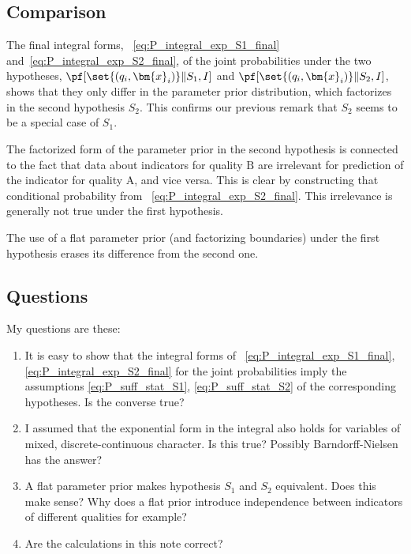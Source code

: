 \documentclass[10pt,%
onecolumn,oneside,a5paper,article,frenchb,italian,german,swedish,latin,british%
]{memoir}
\newcommand*{\yI}{I}
\newcommand*{\yS}{S}
\newcommand*{\yh}{q}
\newcommand*{\bx}{\bm{x}}
\newcommand*{\ya}{\textrm{A}}
\newcommand*{\yb}{\textrm{B}}
\begin{document}
\subsection{Comparison}
\label{sec:comparison}

The final integral forms, \eqns~\eqref{eq:P_integral_exp_S1_final}
and~\eqref{eq:P_integral_exp_S2_final}, of the joint probabilities under
the two hypotheses, $\pf[\set{(\yh_i,\bx_i)} \| \yS_1, \yI]$ and
$\pf[\set{(\yh_i,\bx_i)} \| \yS_2, \yI]$, shows that they only differ in
the parameter prior distribution, which factorizes in the second hypothesis
$\yS_2$. This confirms our previous remark that $\yS_2$ seems to be a
special case of $\yS_1$.

The factorized form of the parameter prior in the second hypothesis is
connected to the fact that data about indicators for quality $\yb$ are
irrelevant for prediction of the indicator for quality $\ya$, and vice
versa. This is clear by constructing that conditional probability from
\eqn~\eqref{eq:P_integral_exp_S2_final}. This irrelevance is generally not
true under the first hypothesis.

The use of a flat parameter prior (and factorizing boundaries)
under the first hypothesis erases its difference from the second one.

\subsection{Questions}
\label{sec:questions_final}

My questions are these:

\begin{enumerate}
\item It is easy to show that the integral forms of
  \eqns~\eqref{eq:P_integral_exp_S1_final},
  \eqref{eq:P_integral_exp_S2_final} for the joint probabilities imply the
  assumptions \eqref{eq:P_suff_stat_S1}, \eqref{eq:P_suff_stat_S2} of the
  corresponding hypotheses. Is the converse true?

\item I assumed that the exponential form in the integral also holds for
  variables of mixed, discrete-continuous character. Is this true? Possibly
  Barndorff-Nielsen  has the answer?

\item A flat parameter prior makes hypothesis $\yS_1$ and $\yS_2$
  equivalent. Does this make sense? Why does a flat prior introduce
  independence between indicators of different qualities for example?

\item Are the calculations in this note correct?
\end{enumerate}
  
\end{document}
